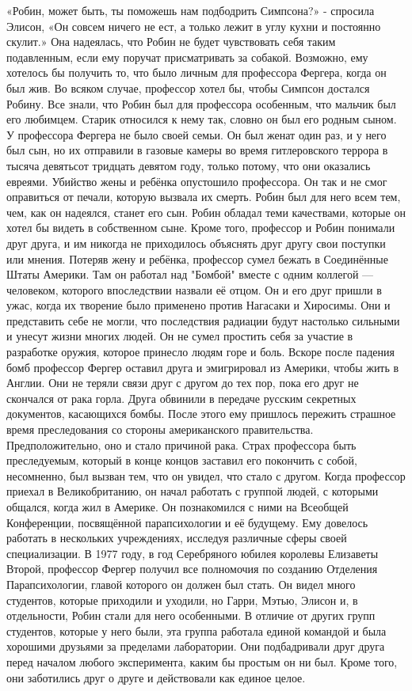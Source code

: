 \documentclass[a4paper,12pt]{book}
\begin{document}
	«Робин, может быть, ты поможешь нам подбодрить Симпсона?» - спросила Элисон,
	«Он совсем ничего не ест, а только лежит в углу кухни и постоянно скулит.»
	Она надеялась, что Робин не будет чувствовать себя таким подавленным, если ему поручат присматривать за собакой. Возможно, ему хотелось бы получить то, что было личным для профессора Фергера, когда он был жив. Во всяком случае, профессор хотел бы, чтобы Симпсон достался Робину.
	Все знали, что Робин был для профессора особенным, что мальчик был его любимцем. Старик относился к нему так, словно он был его родным сыном. У профессора Фергера не было своей семьи. Он был женат один раз, и у него был сын, но их отправили в газовые камеры во время гитлеровского террора в тысяча девятьсот тридцать девятом году, только потому, что они оказались евреями.
	Убийство жены и ребёнка опустошило профессора. Он так и не смог оправиться от печали, которую вызвала их смерть. Робин был для него всем тем, чем, как он надеялся, станет его сын. Робин обладал теми качествами, которые он хотел бы видеть в собственном сыне. Кроме того, профессор и Робин понимали друг друга, и им никогда не приходилось объяснять друг другу свои поступки или мнения.
	Потеряв жену и ребёнка, профессор сумел бежать в Соединённые Штаты Америки. Там он работал над "Бомбой" вместе с одним коллегой — человеком, которого впоследствии назвали её отцом. Он и его друг пришли в ужас, когда их творение было применено против Нагасаки и Хиросимы. Они и представить себе не могли, что последствия радиации будут настолько сильными и унесут жизни многих людей.
	Он не сумел простить себя за участие в разработке оружия, которое принесло людям горе и боль.
	Вскоре после падения бомб профессор Фергер оставил друга и эмигрировал из Америки, чтобы жить в Англии. Они не теряли связи друг с другом до тех пор, пока его друг не скончался от рака горла.
	Друга обвинили в передаче русским секретных документов, касающихся бомбы. После этого ему пришлось пережить страшное время преследования со стороны американского правительства. Предположительно, оно и стало причиной рака.
	Страх профессора быть преследуемым, который в конце концов заставил его покончить с собой, несомненно, был вызван тем, что он увидел, что стало с другом.
	Когда профессор приехал в Великобританию, он начал работать с группой людей, с которыми общался, когда жил в Америке. Он познакомился с ними на Всеобщей Конференции, посвящённой парапсихологии и её будущему. Ему довелось работать в нескольких учреждениях, исследуя различные сферы своей специализации. В 1977 году, в год Серебряного юбилея королевы Елизаветы Второй, профессор Фергер получил все полномочия по созданию Отделения Парапсихологии, главой которого он должен был стать.
	Он видел много студентов, которые приходили и уходили, но Гарри, Мэтью, Элисон и, в отдельности, Робин стали для него особенными. В отличие от других групп студентов, которые у него были, эта группа работала единой командой и была хорошими друзьями за пределами лаборатории. Они подбадривали друг друга перед началом любого эксперимента, каким бы простым он ни был. Кроме того, они заботились друг о друге и действовали как единое целое.
\end{document}
